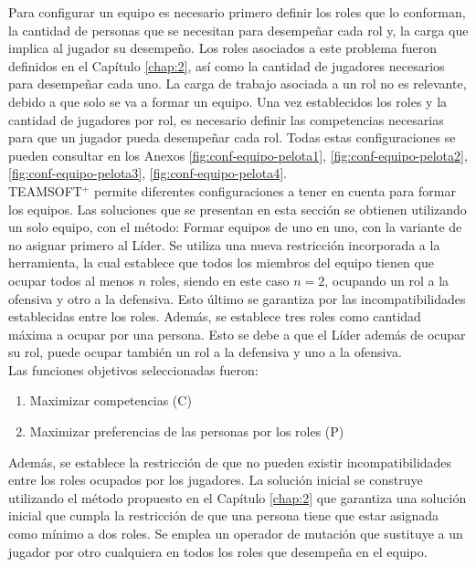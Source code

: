 Para configurar un equipo es necesario primero definir los roles que lo conforman, la cantidad de personas que se necesitan para desempeñar cada rol y, la carga que implica al jugador su desempeño. Los roles asociados a este problema fueron definidos en el Capítulo \ref{chap:2}, así como la cantidad de jugadores necesarios para desempeñar cada uno. La carga de trabajo asociada a un rol no es relevante, debido a que solo se va a formar un equipo. Una vez establecidos los roles y la cantidad de jugadores por rol, es necesario definir las competencias necesarias para que un jugador pueda desempeñar cada rol. Todas estas configuraciones se pueden consultar en los Anexos \ref{fig:conf-equipo-pelota1}, \ref{fig:conf-equipo-pelota2}, \ref{fig:conf-equipo-pelota3}, \ref{fig:conf-equipo-pelota4}. \\

TEAMSOFT$^+$ permite diferentes configuraciones a tener en cuenta para formar los equipos. Las soluciones que se presentan en esta sección se obtienen utilizando un solo equipo, con el método: Formar equipos de uno en uno, con la variante de no asignar primero al Líder. Se utiliza una nueva restricción  incorporada a la herramienta, la cual establece que todos los miembros del equipo tienen que ocupar todos al menos $n$ roles, siendo en este caso $n=2$, ocupando un rol a la ofensiva y otro a la defensiva. Esto último se garantiza por las incompatibilidades establecidas entre los roles. Además, se establece tres roles como cantidad máxima a ocupar por una persona. Esto se debe a que el Líder además de ocupar su rol, puede ocupar también un rol a la defensiva y uno a la ofensiva.\\


Las funciones objetivos seleccionadas fueron:
\begin{enumerate}
	\setlength\itemsep{0em}
	\item Maximizar competencias (C)
	\item Maximizar preferencias de las personas por los roles (P)
\end{enumerate}

Además, se establece la restricción de que no pueden existir incompatibilidades entre los roles ocupados por los jugadores. La solución inicial se construye utilizando el método propuesto en el Capítulo \ref{chap:2} que garantiza una solución inicial que cumpla la restricción de que una persona tiene que estar asignada como mínimo a dos roles. Se emplea un operador de mutación que sustituye a un jugador por otro cualquiera en todos los roles que desempeña en el equipo. \\

